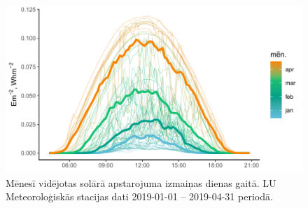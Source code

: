 \begin{figure}[h]
    \centering
    \includegraphics[width=\linewidth]{figures/meteo/mean19.pdf}
    \caption{Mēnesī vidējotas solārā apstarojuma izmaiņas dienas gaitā. LU Meteoroloģiskās stacijas dati 2019-01-01 -- 2019-04-31 periodā.}
    \label{fig:met_Irrad_mean}
\end{figure}
